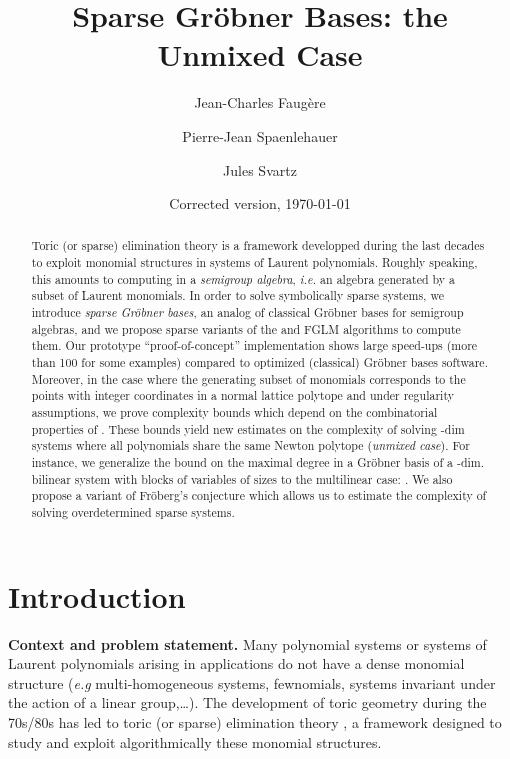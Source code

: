 \documentclass[12pt]{article}
\numberwithin{equation}{section}
\numberwithin{theorem}{section}
\begin{document}
\title{Sparse Gr\"obner Bases: the Unmixed Case}
\author[1,2,3,4]{Jean-Charles Faug\`ere}
\author[5,6,7,8]{Pierre-Jean Spaenlehauer}
\author[2,1,3,4]{\authorcr Jules Svartz}



\date{Corrected version, \today}

\maketitle
\begin{abstract}
  Toric (or sparse) elimination theory is a framework developped
  during the last decades to exploit monomial structures in
  systems of Laurent polynomials. Roughly speaking, this amounts to computing in a \emph{semigroup algebra}, \emph{i.e.} an
  algebra generated by a subset of Laurent monomials.  In order to solve symbolically sparse systems, we introduce
  \emph{sparse Gr\"obner bases}, an analog of classical Gr\"obner
  bases for semigroup algebras, and we propose sparse variants of the
   and FGLM algorithms to compute them.  Our prototype
  ``proof-of-concept'' implementation shows large speed-ups
  (more than 100 for some examples) compared to optimized (classical)
  Gr\"obner bases software.  Moreover, in the case where the
  generating subset of monomials corresponds to the points with integer coordinates in a
  normal lattice polytope  and under regularity
  assumptions, we prove complexity bounds which
  depend on the combinatorial properties of . These bounds
  yield new estimates on the complexity of solving -dim systems
  where all polynomials share the same Newton polytope (\emph{unmixed case}).
  For instance, we generalize the bound  on
  the maximal degree in a Gr\"obner basis of a -dim. bilinear
  system with blocks of variables of sizes  to the
  multilinear case: . We also propose a
  variant of Fr\"oberg's conjecture which allows us to estimate the
  complexity of solving overdetermined sparse systems.
\end{abstract}

\section{Introduction} {\bf Context and problem statement.} Many
polynomial systems or systems of Laurent polynomials arising in
applications do not have a dense monomial structure (\emph{e.g}
multi-homogeneous systems, fewnomials, systems invariant under the action of a linear
group,\ldots). The development of
toric geometry during the 70s/80s has led to toric (or
sparse) elimination theory \cite{Stu91}, a framework designed to
study and exploit algorithmically these monomial structures.
\end{document}
